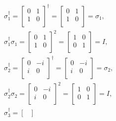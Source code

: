 \documentclass[a4paper,12pt]{article}
\begin{document}
    \begin{gather}
        \nonumber
        \sigma_1 ^ \dagger = \begin{bmatrix}
            0 & 1\\
            1 & 0\\
        \end{bmatrix} ^ \dagger =
        \begin{bmatrix}
            0 & 1\\
            1 & 0\\
        \end{bmatrix} =
        \sigma_1 \textrm{,} \\
        \nonumber
        \sigma_1 ^ \dagger \sigma_1 =
        \begin{bmatrix}
            0 & 1\\
            1 & 0\\
        \end{bmatrix} ^ 2 =
        \begin{bmatrix}
            1 & 0\\
            0 & 1\\
        \end{bmatrix} = I \textrm{,} \\
        \nonumber
        \sigma_2 ^ \dagger = \begin{bmatrix}
            0 & -i\\
            i & 0\\
        \end{bmatrix} ^ \dagger =
        \begin{bmatrix}
            0 & -i\\
            i & 0\\
        \end{bmatrix} =
        \sigma_2 \textrm{,} \\
        \nonumber
        \sigma_2 ^ \dagger \sigma_2 =
        \begin{bmatrix}
            0 & -i\\
            i & 0\\
        \end{bmatrix} ^ 2 =
        \begin{bmatrix}
            1 & 0\\
            0 & 1\\
        \end{bmatrix} = I \textrm{,} \\
        \nonumber
        \sigma_3 ^ \dagger = \begin{bmatrix}

\end{bmatrix}
\end{gather}
\end{document}
